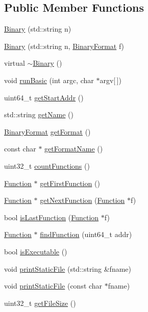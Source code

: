 \subsection*{\-Public \-Member \-Functions}
\begin{DoxyCompactItemize}
\item 
\hyperlink{class_e_p_a_x_1_1_binary_ad423337a4b3db46476c82649fc66ecc1}{\-Binary} (std\-::string n)
\item 
\hyperlink{class_e_p_a_x_1_1_binary_ac675512e9efc0881ab5e83a215adfdd6}{\-Binary} (std\-::string n, \hyperlink{namespace_e_p_a_x_a4be639c006ef14def4708b37ee6dd67d}{\-Binary\-Format} f)
\item 
virtual \hyperlink{class_e_p_a_x_1_1_binary_a70f9599a0d1bca21d5754e642047da73}{$\sim$\-Binary} ()
\item 
void \hyperlink{class_e_p_a_x_1_1_binary_a81b916828abd97f8d2e100219f794ca8}{run\-Basic} (int argc, char $\ast$argv\mbox{[}$\,$\mbox{]})
\item 
uint64\-\_\-t \hyperlink{class_e_p_a_x_1_1_binary_a1a0fffa95568cc49ca69d92475866123}{get\-Start\-Addr} ()
\item 
std\-::string \hyperlink{class_e_p_a_x_1_1_binary_a98a84a6650f61a8d991bf9097d9a989b}{get\-Name} ()
\item 
\hyperlink{namespace_e_p_a_x_a4be639c006ef14def4708b37ee6dd67d}{\-Binary\-Format} \hyperlink{class_e_p_a_x_1_1_binary_a77cec506fbd4bc57e5bd0eed0d808902}{get\-Format} ()
\item 
const char $\ast$ \hyperlink{class_e_p_a_x_1_1_binary_aa7cc363e1e514cc97050e85e03c9ed84}{get\-Format\-Name} ()
\item 
uint32\-\_\-t \hyperlink{class_e_p_a_x_1_1_binary_a122d78f5264e90338d9833b181839c95}{count\-Functions} ()
\item 
\hyperlink{class_e_p_a_x_1_1_function}{\-Function} $\ast$ \hyperlink{class_e_p_a_x_1_1_binary_a5616364ee9c96da558b94af2ad299788}{get\-First\-Function} ()
\item 
\hyperlink{class_e_p_a_x_1_1_function}{\-Function} $\ast$ \hyperlink{class_e_p_a_x_1_1_binary_af69f8f6130b81c4c8c09dd380fa62d8d}{get\-Next\-Function} (\hyperlink{class_e_p_a_x_1_1_function}{\-Function} $\ast$f)
\item 
bool \hyperlink{class_e_p_a_x_1_1_binary_a034e51a36f35dd0da6f81d728328e3df}{is\-Last\-Function} (\hyperlink{class_e_p_a_x_1_1_function}{\-Function} $\ast$f)
\item 
\hyperlink{class_e_p_a_x_1_1_function}{\-Function} $\ast$ \hyperlink{class_e_p_a_x_1_1_binary_aed61687c67d986596865c8cd068cfd2f}{find\-Function} (uint64\-\_\-t addr)
\item 
bool \hyperlink{class_e_p_a_x_1_1_binary_a6a4f7d1494137b9f3a3926b620864847}{is\-Executable} ()
\item 
void \hyperlink{class_e_p_a_x_1_1_binary_a05b4aa5fe82b7cc1ef774148f5f57a37}{print\-Static\-File} (std\-::string \&fname)
\item 
void \hyperlink{class_e_p_a_x_1_1_binary_a7d64388704852033519f660d3e5d125f}{print\-Static\-File} (const char $\ast$fname)
\item 
uint32\-\_\-t \hyperlink{class_e_p_a_x_1_1_binary_a875b74e881fb5560eee2bb0e1b8fec43}{get\-File\-Size} ()
\end{DoxyCompactItemize}
